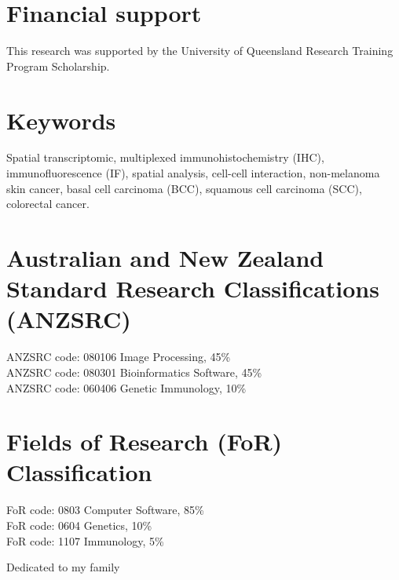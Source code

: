 

\clearpage
\section*{Financial support}
This research was supported by the University of Queensland Research Training Program Scholarship. 






\section*{Keywords}
Spatial transcriptomic, multiplexed immunohistochemistry (IHC), immunofluorescence (IF), spatial analysis, cell-cell interaction, non-melanoma skin cancer, basal cell carcinoma (BCC), squamous cell carcinoma (SCC), colorectal cancer.




\section*{Australian and New Zealand Standard Research Classifications (ANZSRC)}

ANZSRC code: 080106 Image Processing, 45\%  \\
ANZSRC code: 080301 Bioinformatics Software, 45\% \\ 
ANZSRC code: 060406 Genetic Immunology, 10\%

\section*{Fields of Research (FoR) Classification}

FoR code: 0803 Computer Software, 85\% \\
FoR code: 0604 Genetics, 10\% \\
FoR code: 1107 Immunology, 5\%


\clearpage
Dedicated to my family


\pagebreak
\pagestyle{headings}


\clearpage
\tableofcontents
	\clearpage
\listoffigures
	\clearpage
\listoftables
\newpage
